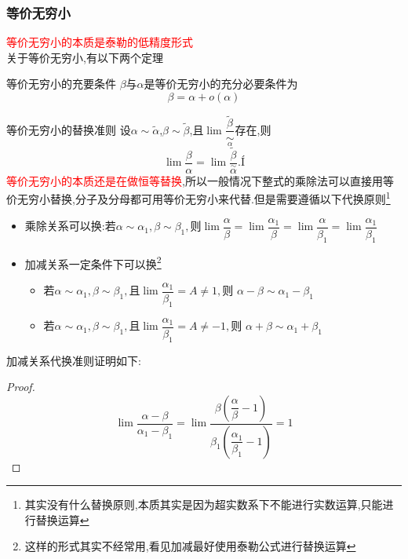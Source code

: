 \documentclass[8pt a4paper, oneside, UTF8]{ctexbook}
\begin{document}
\begin{sloppypar}
    \subsubsection{等价无穷小}
    \textcolor{red}{等价无穷小的本质是泰勒的低精度形式}\\
    关于等价无穷小,有以下两个定理
    \begin{defn}{等价无穷小的充要条件}{}
        $\beta$与$\alpha$是等价无穷小的充分必要条件为
        $$
            \beta=\alpha + o(\alpha)
        $$
    \end{defn}
    \begin{defn}{等价无穷小的替换准则}{}
        设$\alpha\sim\widetilde{\alpha}$,$\beta\sim\widetilde{\beta}$,且$\lim\dfrac{\widetilde{\beta}}{\underset{\alpha}{\operatorname*{\sim}}}$存在,则
        $$
            \lim\dfrac{\beta}{\alpha}=\lim\dfrac{\widetilde{\beta}}{\overset{\sim}{\alpha}}.Í
        $$
        \textcolor{red}{等价无穷小的本质还是在做恒等替换},所以一般情况下整式的乘除法可以直接用等价无穷小替换,分子及分母都可用等价无穷小来代替.但是需要遵循以下代换原则\footnote{其实没有什么替换原则,本质其实是因为超实数系下不能进行实数运算,只能进行替换运算}
        \begin{itemize}
            \item 乘除关系可以换:若$\alpha\sim\alpha_1,\beta\sim\beta_1,\text{则}\lim\dfrac\alpha\beta=\lim\dfrac{\alpha_1}\beta=\lim\dfrac\alpha{\beta_1}=\lim\dfrac{\alpha_1}{\beta_1}$
            \item 加减关系一定条件下可以换\footnote{这样的形式其实不经常用,看见加减最好使用泰勒公式进行替换运算}
                  \begin{itemize}
                      \item 若$\alpha\sim\alpha_{1},\beta\sim\beta_{1},\text{且}\operatorname*{lim}\dfrac{\alpha_{1}}{\beta_{1}}=A\neq1,\text{则 }\alpha-\beta\sim\alpha_{1}-\beta_{1}$
                      \item 若$\alpha\sim\alpha_{1},\beta\sim\beta_{1},\text{且}\operatorname*{lim}\dfrac{\alpha_{1}}{\beta_{1}}=A\neq-1,\text{则 }\alpha+\beta\sim\alpha_{1}+\beta_{1}$
                  \end{itemize}
        \end{itemize}
        加减关系代换准则证明如下:
        \begin{proof}
            $$\lim \dfrac{\alpha-\beta}{\alpha_1 -\beta_1}=\lim \dfrac{\beta (\dfrac{\alpha}{\beta}-1)}{\beta_1(\dfrac{\alpha_1}{\beta_1}-1)}=1$$
        \end{proof}
    \end{defn}

\end{sloppypar}
\end{document}
